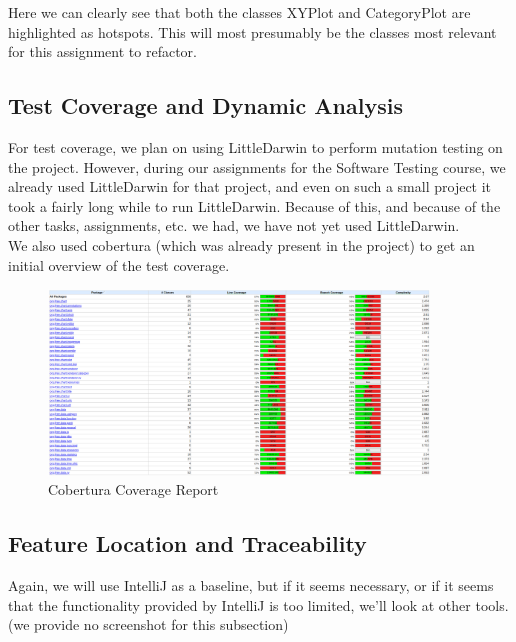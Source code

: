 \documentclass{article}
\begin{document}
Here we can clearly see that both the classes XYPlot and CategoryPlot are highlighted as hotspots. This will most presumably be the classes most relevant for this assignment to refactor.

\newpage
\subsection{Test Coverage and Dynamic Analysis}

For test coverage, we plan on using LittleDarwin to perform mutation testing on the project. However, during our assignments for the Software Testing course, we already used LittleDarwin for that project, and even on such a small project it took a fairly long while to run LittleDarwin. Because of this, and because of the other tasks, assignments, etc. we had, we have not yet used LittleDarwin.\\

We also used cobertura (which was already present in the project) to get an initial overview of the test coverage.

\begin{figure}[H]
\centering
	\includegraphics[width=0.9\textwidth]{cobertura_coverage.png}
	\caption{Cobertura Coverage Report}
\end{figure}

\subsection{Feature Location and Traceability}

Again, we will use IntelliJ as a baseline, but if it seems necessary, or if it seems that the functionality provided by IntelliJ is too limited, we'll look at other tools.\\

\noindent
(we provide no screenshot for this subsection)
\end{document}

